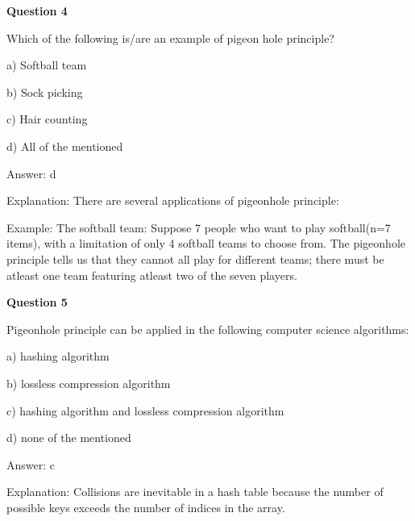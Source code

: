 \documentclass{article}
\begin{document}
\begin{mdframed}[linewidth=1pt, roundcorner=5pt, linecolor=gray!30, backgroundcolor=gray!5]
\textbf{Question 4} 

Which of the following is/are an example of pigeon hole principle?

a) Softball team

b) Sock picking

c) Hair counting

d) All of the mentioned
\vspace{5pt} \par
\begin{tcolorbox}[colback=green!5, colframe=green!40!black, title=Solution]
Answer: d

Explanation: There are several applications of pigeonhole principle:

Example: The softball team: Suppose 7 people who want to play softball(n=7 items), with a limitation of only 4 softball teams to choose from. The pigeonhole principle tells us that they cannot all play for different teams; there must be atleast one team featuring atleast two of the seven players.
\end{tcolorbox}
\end{mdframed}

\begin{mdframed}[linewidth=1pt, roundcorner=5pt, linecolor=gray!30, backgroundcolor=gray!5]
\textbf{Question 5} 

Pigeonhole principle can be applied in the following computer science algorithms:

a) hashing algorithm

b) lossless compression algorithm

c) hashing algorithm and lossless compression algorithm

d) none of the mentioned
\vspace{5pt} \par
\begin{tcolorbox}[colback=green!5, colframe=green!40!black, title=Solution]
Answer: c

Explanation: Collisions are inevitable in a hash table because the number of possible keys exceeds the number of indices in the array.
\end{tcolorbox}
\end{mdframed}
\end{document}
